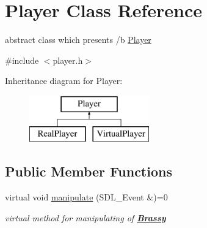 \hypertarget{class_player}{}\section{Player Class Reference}
\label{class_player}


abstract class which presents /b \mbox{\hyperlink{class_player}{Player}}  




{\ttfamily \#include $<$player.\+h$>$}

Inheritance diagram for Player\+:\begin{figure}[H]
\begin{center}
\leavevmode
\includegraphics[height=2.000000cm]{d8/d53/class_player}
\end{center}
\end{figure}
\subsection*{Public Member Functions}
\begin{DoxyCompactItemize}
\item 
\mbox{\label{class_player_a380eab90036f795ef8970c3dc98259c9}} 
virtual void \mbox{\hyperlink{class_player_a380eab90036f795ef8970c3dc98259c9}{manipulate}} (S\+D\+L\+\_\+\+Event \&)=0
\begin{DoxyCompactList}\small\item\em virtual {\itshape method} for manipulating of {\bfseries{\mbox{\hyperlink{class_brassy}{Brassy}}}} \end{DoxyCompactList}\end{DoxyCompactItemize}
